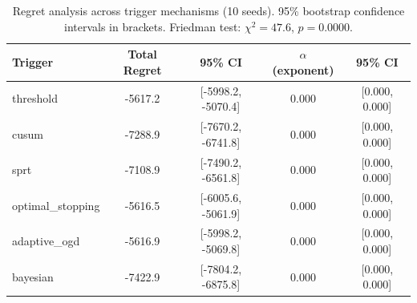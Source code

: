 \begin{table}[t]
\centering
\caption{Regret analysis across trigger mechanisms (10 seeds). 95\% bootstrap confidence intervals in brackets. Friedman test: $\chi^2=47.6$, $p=0.0000$.}
\label{tab:regret-statistical}
\small
\begin{tabular}{lcccc}
\toprule
Trigger & Total Regret & 95\% CI & $\alpha$ (exponent) & 95\% CI \\
\midrule
  threshold & -5617.2 & [-5998.2, -5070.4] & 0.000 & [0.000, 0.000] \\
  cusum & -7288.9 & [-7670.2, -6741.8] & 0.000 & [0.000, 0.000] \\
  sprt & -7108.9 & [-7490.2, -6561.8] & 0.000 & [0.000, 0.000] \\
  optimal\_stopping & -5616.5 & [-6005.6, -5061.9] & 0.000 & [0.000, 0.000] \\
  adaptive\_ogd & -5616.9 & [-5998.2, -5069.8] & 0.000 & [0.000, 0.000] \\
  bayesian & -7422.9 & [-7804.2, -6875.8] & 0.000 & [0.000, 0.000] \\
\bottomrule
\end{tabular}
\end{table}


